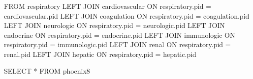 \documentclass[
  letterpaper,
  DIV=11,
  numbers=noendperiod]{scrartcl}
\newenvironment{Shaded}{\begin{snugshade}}{\end{snugshade}}
\newcommand{\KeywordTok}[1]{\textcolor[rgb]{0.00,0.23,0.31}{#1}}
\newcommand{\NormalTok}[1]{\textcolor[rgb]{0.00,0.23,0.31}{#1}}
\newcommand{\OperatorTok}[1]{\textcolor[rgb]{0.37,0.37,0.37}{#1}}
\begin{document}
\begin{Shaded}
\begin{Highlighting}[]
\KeywordTok{FROM}\NormalTok{ respiratory}
\KeywordTok{LEFT} \KeywordTok{JOIN}\NormalTok{ cardiovascular}
\KeywordTok{ON}\NormalTok{ respiratory.pid }\OperatorTok{=}\NormalTok{ cardiovascular.pid}
\KeywordTok{LEFT} \KeywordTok{JOIN}\NormalTok{ coagulation}
\KeywordTok{ON}\NormalTok{ respiratory.pid }\OperatorTok{=}\NormalTok{ coagulation.pid}
\KeywordTok{LEFT} \KeywordTok{JOIN}\NormalTok{ neurologic}
\KeywordTok{ON}\NormalTok{ respiratory.pid }\OperatorTok{=}\NormalTok{ neurologic.pid}
\KeywordTok{LEFT} \KeywordTok{JOIN}\NormalTok{ endocrine}
\KeywordTok{ON}\NormalTok{ respiratory.pid }\OperatorTok{=}\NormalTok{ endocrine.pid}
\KeywordTok{LEFT} \KeywordTok{JOIN}\NormalTok{ immunologic}
\KeywordTok{ON}\NormalTok{ respiratory.pid }\OperatorTok{=}\NormalTok{ immunologic.pid}
\KeywordTok{LEFT} \KeywordTok{JOIN}\NormalTok{ renal}
\KeywordTok{ON}\NormalTok{ respiratory.pid }\OperatorTok{=}\NormalTok{ renal.pid}
\KeywordTok{LEFT} \KeywordTok{JOIN}\NormalTok{ hepatic}
\KeywordTok{ON}\NormalTok{ respiratory.pid }\OperatorTok{=}\NormalTok{ hepatic.pid}
\end{Highlighting}
\end{Shaded}

\begin{Shaded}
\begin{Highlighting}[]
\KeywordTok{SELECT} \OperatorTok{*} \KeywordTok{FROM}\NormalTok{ phoenix8}
\end{Highlighting}
\end{Shaded}
\end{document}
